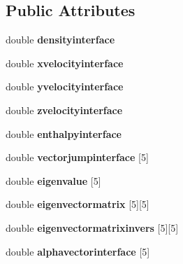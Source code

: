 \subsection*{Public Attributes}
\begin{DoxyCompactItemize}
\item 
double {\bfseries densityinterface}\hypertarget{classinterface_ace53406f35ee24a035c55d96ed0e6768}{}\label{classinterface_ace53406f35ee24a035c55d96ed0e6768}

\item 
double {\bfseries xvelocityinterface}\hypertarget{classinterface_af3cd3adc6c9d515275b6e6f3140ccc93}{}\label{classinterface_af3cd3adc6c9d515275b6e6f3140ccc93}

\item 
double {\bfseries yvelocityinterface}\hypertarget{classinterface_ad30f1f0e2533984f641910505e12c546}{}\label{classinterface_ad30f1f0e2533984f641910505e12c546}

\item 
double {\bfseries zvelocityinterface}\hypertarget{classinterface_af133f3c51de59096a370d7b2b22091a1}{}\label{classinterface_af133f3c51de59096a370d7b2b22091a1}

\item 
double {\bfseries enthalpyinterface}\hypertarget{classinterface_a46f84c2e6fe06cb8866f448f34fa7a36}{}\label{classinterface_a46f84c2e6fe06cb8866f448f34fa7a36}

\item 
double {\bfseries vectorjumpinterface} \mbox{[}5\mbox{]}\hypertarget{classinterface_acca11cfd3174a7b95aecfd29cd0bbad5}{}\label{classinterface_acca11cfd3174a7b95aecfd29cd0bbad5}

\item 
double {\bfseries eigenvalue} \mbox{[}5\mbox{]}\hypertarget{classinterface_a08f725fb98fd19516528be5725dfb5c0}{}\label{classinterface_a08f725fb98fd19516528be5725dfb5c0}

\item 
double {\bfseries eigenvectormatrix} \mbox{[}5\mbox{]}\mbox{[}5\mbox{]}\hypertarget{classinterface_a87840e2b4ccbf408b2a35c0cb6d70730}{}\label{classinterface_a87840e2b4ccbf408b2a35c0cb6d70730}

\item 
double {\bfseries eigenvectormatrixinvers} \mbox{[}5\mbox{]}\mbox{[}5\mbox{]}\hypertarget{classinterface_ab512fee1d69a6bd18f4b757e64fad446}{}\label{classinterface_ab512fee1d69a6bd18f4b757e64fad446}

\item 
double {\bfseries alphavectorinterface} \mbox{[}5\mbox{]}\hypertarget{classinterface_a7c9d194ae9ec9c5566c669f4559681be}{}\label{classinterface_a7c9d194ae9ec9c5566c669f4559681be}


\end{DoxyCompactItemize}

